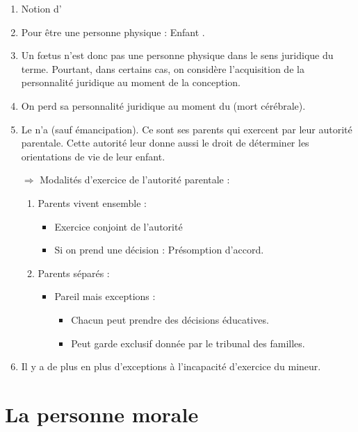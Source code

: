 \begin{enumerate}
    \item Notion d'
    \item Pour être une personne physique : Enfant .
    \item Un fœtus n'est donc pas une personne physique dans le sens juridique du terme. Pourtant, dans certains cas, on considère l'acquisition de la personnalité juridique au moment de la conception.
    \item On perd sa personnalité juridique au moment du  (mort cérébrale).
    \item Le  n'a  (sauf émancipation). Ce sont ses parents qui exercent par leur autorité parentale. Cette autorité leur donne aussi le droit de déterminer les orientations de vie de leur enfant. 
    
    $\Rightarrow$ Modalités d'exercice de l'autorité parentale :
    \begin{enumerate}
        \item Parents vivent ensemble :
        \begin{itemize}
            \item Exercice conjoint de l'autorité
            \item Si on prend une décision : Présomption d'accord.
        \end{itemize}
        \item Parents séparés :
        \begin{itemize}
            \item Pareil mais exceptions :
            \begin{itemize}
                \item Chacun peut prendre des décisions éducatives.
                \item Peut garde exclusif donnée par le tribunal des familles.
             \end{itemize} 
        \end{itemize}
    \end{enumerate}
    \item Il y a de plus en plus d'exceptions à l'incapacité d'exercice du mineur.
\end{enumerate}

\section{La personne morale}

